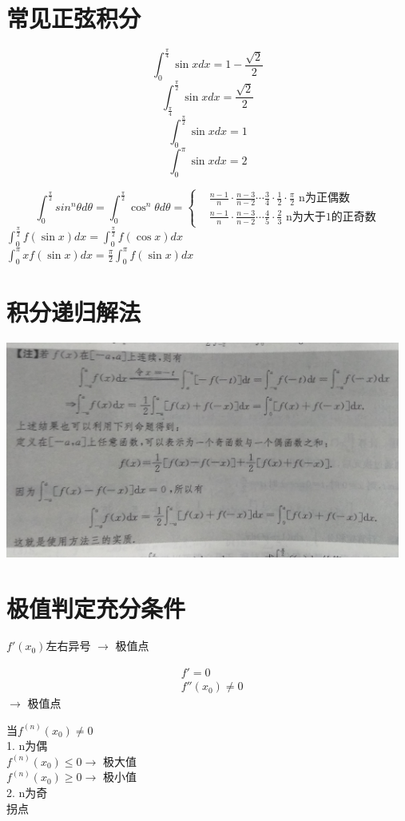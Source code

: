\documentclass[UTF8]{ctexart}
\begin{document}
\section{常见正弦积分}

$$ \int_0^\frac{\pi}{4} \sin x dx =1- \frac{\sqrt{2}}{2}$$
$$ \int_\frac{\pi}{4}^\frac{\pi}{2} \sin x dx =\frac{\sqrt{2}}{2}$$
$$ \int_0^\frac{\pi}{2} \sin x dx = 1$$
$$ \int_0^\pi \sin x dx =2$$

$$ \int_0^\frac{\pi}{2} sin^n θ d \theta =\int_0^\frac{\pi}{2} \cos^n \theta d \theta =
\begin{cases}
  &\frac{n-1}{n}\cdot\frac{n-3}{n-2} \cdots \frac{3}{4}\cdot\frac{1}{2}\cdot\frac{\pi}{2}\mbox{  n为正偶数} \\
  &\frac{n-1}{n}\cdot\frac{n-3}{n-2}\cdots\frac{4}{5}\cdot\frac{2}{3}\mbox{  n为大于1的正奇数}
\end{cases}
$$
$\int_0^\frac{\pi}{2} f(\sin x) dx = \int_0^\frac{\pi}{2} f(\cos x) dx$ \\
$\int_0^\pi x f(\sin x) dx = \frac{\pi}{2} \int_0^\pi f(\sin x)dx$
\section{积分递归解法}
\includegraphics[width=13cm]{9345E7/2002379869.jpg}

\section{极值判定充分条件}
$f '(x_0)$左右异号 $\rightarrow$ 极值点

\begin{align}
&f'=0 \\
&f''(x_0) \neq 0
\end{align}
$\rightarrow$ 极值点

当$ f^{(n)} (x_0) \neq 0$ \\
1. n为偶   \\
    $f^{(n)} (x_0) \leq 0 \rightarrow $ 极大值  \\
    $f^{(n)} (x_0) \geq 0 \rightarrow $ 极小值  \\
    2. n为奇  \\
        拐点  \\
\end{document}
